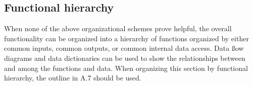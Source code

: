 	\subsection{Functional hierarchy}
		When none of the above organizational schemes prove helpful, the overall functionality can be organized into a hierarchy of functions organized by either common inputs, common outputs, or common internal data access. Data ßow diagrams and data dictionaries can be used to show the relationships between and among the functions and data. When organizing this section by functional hierarchy, the outline in A.7 should be
used.
	